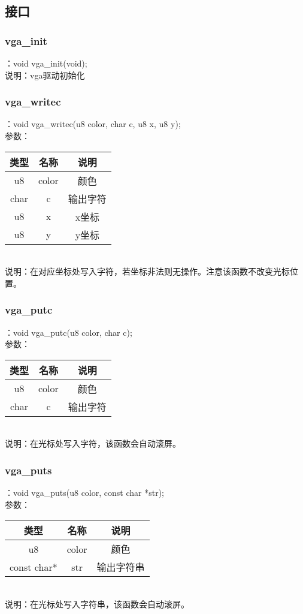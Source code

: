 \subsection{接口}

\subsubsection{vga\_init}
：void vga\_init(void);\\
说明：vga驱动初始化

\subsubsection{vga\_writec}
：void vga\_writec(u8 color, char c, u8 x, u8 y);\\
参数：\\
\begin{tabular}{|c|c|c|}
    \hline
    类型 & 名称 & 说明\\\hline
    u8 & color & 颜色\\\hline
    char & c & 输出字符\\\hline
    u8 & x & x坐标\\\hline
    u8 & y & y坐标\\\hline
\end{tabular}\\
说明：在对应坐标处写入字符，若坐标非法则无操作。注意该函数不改变光标位置。

\subsubsection{vga\_putc}
：void vga\_putc(u8 color, char c);\\
参数：\\
\begin{tabular}{|c|c|c|}
    \hline
    类型 & 名称 & 说明\\\hline
    u8 & color & 颜色\\\hline
    char & c & 输出字符\\\hline
\end{tabular}\\
说明：在光标处写入字符，该函数会自动滚屏。

\subsubsection{vga\_puts}
：void vga\_puts(u8 color, const char *str);\\
参数：\\
\begin{tabular}{|c|c|c|}
    \hline
    类型 & 名称 & 说明\\\hline
    u8 & color & 颜色\\\hline
    const char* & str & 输出字符串\\\hline
\end{tabular}\\
说明：在光标处写入字符串，该函数会自动滚屏。

